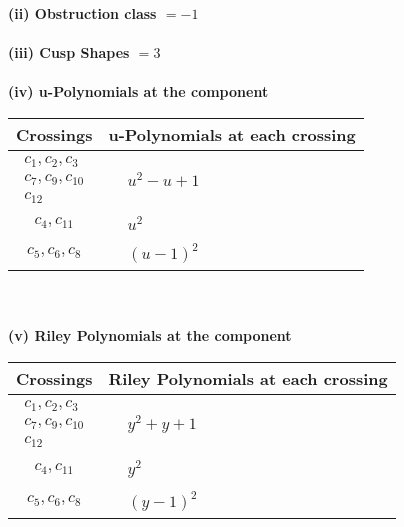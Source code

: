 \documentclass[1p]{elsarticle_modified}
\theoremstyle{definition}
\begin{document}
\flushleft \textbf{(ii) Obstruction class $= -1$}\\~\\
\flushleft \textbf{(iii) Cusp Shapes $= 3$}\\~\\
\newpage\renewcommand{\arraystretch}{1}
\flushleft \textbf{(iv) u-Polynomials at the component}\newline \\
\begin{tabular}{m{50pt}|m{274pt}}
Crossings & \hspace{64pt}u-Polynomials at each crossing \\
\hline $$\begin{aligned}c_{1},c_{2},c_{3}\\c_{7},c_{9},c_{10}\\c_{12}\end{aligned}$$&$\begin{aligned}
&u^2- u+1
\end{aligned}$\\
\hline $$\begin{aligned}c_{4},c_{11}\end{aligned}$$&$\begin{aligned}
&u^2
\end{aligned}$\\
\hline $$\begin{aligned}c_{5},c_{6},c_{8}\end{aligned}$$&$\begin{aligned}
&(u-1)^2
\end{aligned}$\\
\hline
\end{tabular}\\~\\
\newpage\renewcommand{\arraystretch}{1}
\flushleft \textbf{(v) Riley Polynomials at the component}\newline \\
\begin{tabular}{m{50pt}|m{274pt}}
Crossings & \hspace{64pt}Riley Polynomials at each crossing \\
\hline $$\begin{aligned}c_{1},c_{2},c_{3}\\c_{7},c_{9},c_{10}\\c_{12}\end{aligned}$$&$\begin{aligned}
&y^2+y+1
\end{aligned}$\\
\hline $$\begin{aligned}c_{4},c_{11}\end{aligned}$$&$\begin{aligned}
&y^2
\end{aligned}$\\
\hline $$\begin{aligned}c_{5},c_{6},c_{8}\end{aligned}$$&$\begin{aligned}
&(y-1)^2
\end{aligned}$\\
\hline
\end{tabular}\\~\\
\end{document}
